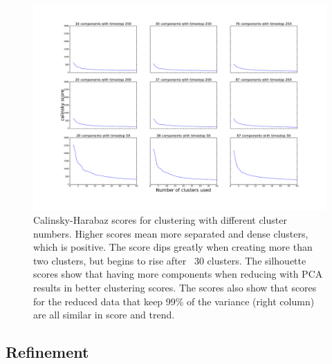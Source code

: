 \documentclass[journal,12pt,onecolumn,draftclsnofoot]{IEEEtran}  %
\begin{document}
\begin{figure}[H]
  \centering
  \includegraphics[width=\linewidth]{figures/calinsky_scores.pdf}
  \caption{Calinsky-Harabaz scores for clustering with different cluster numbers. Higher scores mean more separated and dense clusters, which is positive. The score dips greatly when creating more than two clusters, but begins to rise after ~30 clusters. The silhouette scores show that having more components when reducing with PCA results in better clustering scores. The scores also show that scores for the reduced data that keep 99\% of the variance (right column) are all similar in score and trend.}
  \label{fig:calinsky_scores}
\end{figure}


\subsection{Refinement}
\end{document}
